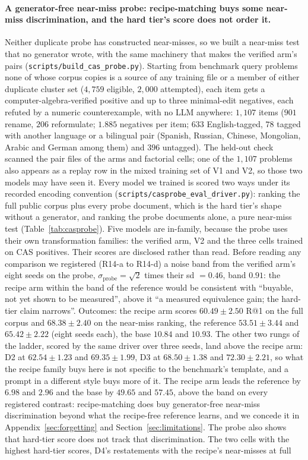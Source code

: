\paragraph{A generator-free near-miss probe: recipe-matching buys some near-miss discrimination, and the hard tier's score does not order it.}
Neither duplicate probe has constructed near-misses, so we built a near-miss test that no generator wrote, with the same machinery that makes the verified arm's pairs (\texttt{scripts/build\_cas\_probe.py}). Starting from benchmark query problems none of whose corpus copies is a source of any training file or a member of either duplicate cluster set ($4{,}759$ eligible, $2{,}000$ attempted), each item gets a computer-algebra-verified positive and up to three minimal-edit negatives, each refuted by a numeric counterexample, with no LLM anywhere: $1{,}107$ items ($901$ rename, $206$ reformulate; $1.885$ negatives per item; $633$ English-tagged, $78$ tagged with another language or a bilingual pair (Spanish, Russian, Chinese, Mongolian, Arabic and German among them) and $396$ untagged). The held-out check scanned the pair files of the arms and factorial cells; one of the $1{,}107$ problems also appears as a replay row in the mixed training set of V1 and V2, so those two models may have seen it. Every model we trained is scored two ways under its recorded encoding convention (\texttt{scripts/casprobe\_eval\_driver.py}): ranking the full public corpus plus every probe document, which is the hard tier's shape without a generator, and ranking the probe documents alone, a pure near-miss test (Table~\ref{tab:casprobe}). Five models are in-family, because the probe uses their own transformation families: the verified arm, V2 and the three cells trained on CAS positives. Their scores are disclosed rather than read. Before reading any comparison we registered (R14-a to R14-d) a noise band from the verified arm's eight seeds on the probe, $\sigma_{\mathrm{probe}} = \sqrt{2}$ times their sd $= 0.46$, band $0.91$: the recipe arm within the band of the reference would be consistent with ``buyable, not yet shown to be measured'', above it ``a measured equivalence gain; the hard-tier claim narrows''. Outcomes: the recipe arm scores $60.49 \pm 2.50$ R@1 on the full corpus and $68.38 \pm 2.40$ on the near-miss ranking, the reference $53.51 \pm 3.44$ and $65.42 \pm 2.22$ (eight seeds each), the base $10.84$ and $10.93$. The other two rungs of the ladder, scored by the same driver over three seeds, land above the recipe arm: D2 at $62.54 \pm 1.23$ and $69.35 \pm 1.99$, D3 at $68.50 \pm 1.38$ and $72.30 \pm 2.21$, so what the recipe family buys here is not specific to the benchmark's template, and a prompt in a different style buys more of it. The recipe arm leads the reference by $6.98$ and $2.96$ and the base by $49.65$ and $57.45$, above the band on every registered contrast: recipe-matching does buy generator-free near-miss discrimination beyond what the recipe-free reference learns, and we concede it in Appendix~\ref{sec:forgetting} and Section~\ref{sec:limitations}. The probe also shows that hard-tier score does not track that discrimination. The two cells with the highest hard-tier scores, D4's restatements with the recipe's near-misses at full 